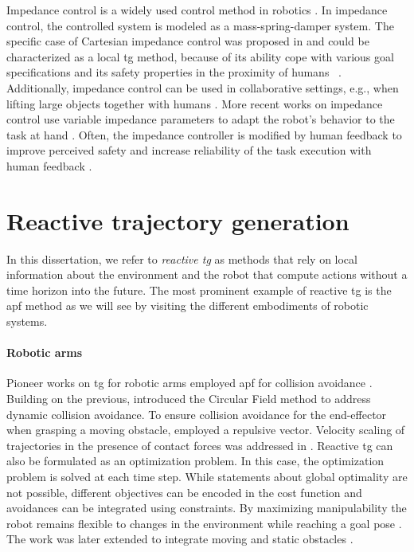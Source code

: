 Impedance control is a widely used control method in
robotics \cite{hogan1985impedance,abu2020variable}. In impedance
control, the controlled system is modeled as a
mass-spring-damper system. The specific case of Cartesian
impedance control was proposed in \cite{albu2002cartesian} and
could be characterized as a local \ac{tg} method, because of
its ability cope with various goal specifications and its
safety properties in the proximity of humans
~\cite{van2022disagreement,hjorth2024enabling}.
Additionally, impedance control can be used in collaborative
settings, e.g., when lifting large objects together with
humans \cite{abu2020variable}. More recent works on
impedance control use variable impedance parameters to adapt
the robot's behavior to the task at hand
\cite{abu2020variable}. Often, the impedance controller is
modified by human feedback to improve perceived safety and
increase reliability of the task execution with human
feedback \cite{lachner2022shaping,franzese2021ilosa}.

\section{Reactive trajectory generation}%
\label{sec:reactive_trajectory_generation}

In this dissertation, we refer to \textit{reactive \ac{tg}}
as methods that rely on local information about the
environment and the robot that compute actions without a
time horizon into the future. The most prominent example of
reactive \ac{tg} is the \acf{apf} method as we will
see by visiting the different embodiments of robotic
systems.

\paragraph{Robotic arms}

Pioneer works on \ac{tg} for robotic arms
employed \ac{apf} for collision avoidance
\cite{Khatib1985,khatib1986real,park2008movement}. Building
on the previous, \cite{Haddadin2011} introduced the Circular
Field method to address dynamic collision avoidance. To
ensure collision avoidance for the end-effector when
grasping a moving obstacle, \cite{Du2018} employed a
repulsive vector.
Velocity scaling of trajectories in the presence of 
contact forces was addressed in \cite{haddadin2010real}.
Reactive \ac{tg} can also be formulated as an optimization
problem. In this case, the optimization problem is solved
at each time step. While statements about global optimality
are not possible, different objectives can be encoded in the
cost function and avoidances can be integrated using
constraints. By maximizing manipulability the robot remains
flexible to changes in the environment while reaching a goal
pose \cite{haviland2020purely}. The work was later extended
to integrate moving and static obstacles
\cite{haviland2021neo}.

